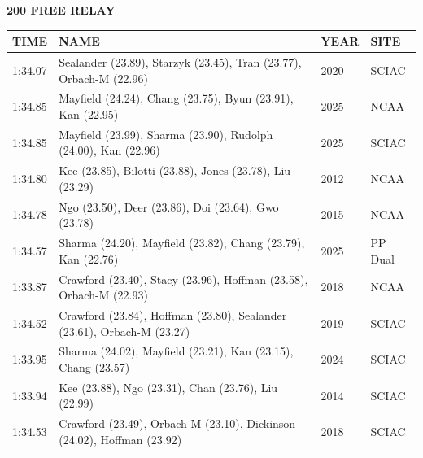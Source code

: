 \begin{table}[H]
\centering
\begin{minipage}[t]{0.6\textwidth}
\centering
\textbf{200 FREE RELAY}\\[0.1cm]
\begin{tabular}{@{}p{1.8cm}p{2.8cm}p{1.2cm}p{1.4cm}@{}}
\hline
    \textbf{TIME} & \textbf{NAME} & \textbf{YEAR} & \textbf{SITE} \\
\hline
    1:34.07 & Sealander (23.89), Starzyk (23.45), Tran (23.77), Orbach-M (22.96) & 2020 & SCIAC \\
    1:34.85 & Mayfield (24.24), Chang (23.75), Byun (23.91), Kan (22.95) & 2025 & NCAA \\
    1:34.85 & Mayfield (23.99), Sharma (23.90), Rudolph (24.00), Kan (22.96) & 2025 & SCIAC \\
    1:34.80 & Kee (23.85), Bilotti (23.88), Jones (23.78), Liu (23.29) & 2012 & NCAA \\
    1:34.78 & Ngo (23.50), Deer (23.86), Doi (23.64), Gwo (23.78) & 2015 & NCAA \\
    1:34.57 & Sharma (24.20), Mayfield (23.82), Chang (23.79), Kan (22.76) & 2025 & PP Dual \\
    1:33.87 & Crawford (23.40), Stacy (23.96), Hoffman (23.58), Orbach-M (22.93) & 2018 & NCAA \\
    1:34.52 & Crawford (23.84), Hoffman (23.80), Sealander (23.61), Orbach-M (23.27) & 2019 & SCIAC \\
    1:33.95 & Sharma (24.02), Mayfield (23.21), Kan (23.15), Chang (23.57) & 2024 & SCIAC \\
    1:33.94 & Kee (23.88), Ngo (23.31), Chan (23.76), Liu (22.99) & 2014 & SCIAC \\
    1:34.53 & Crawford (23.49), Orbach-M (23.10), Dickinson (24.02), Hoffman (23.92) & 2018 & SCIAC \\
\hline
\end{tabular}
\end{minipage}
\end{table}

